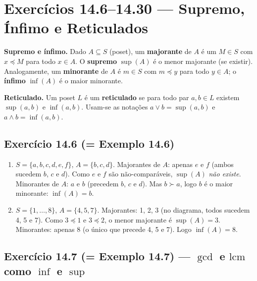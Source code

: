 \documentclass[12pt,a4paper]{article}
\newcommand{\keyword}[1]{\textbf{\textcolor{azul}{#1}}}
\begin{document}
\section*{Exercícios 14.6--14.30 — Supremo, Ínfimo e Reticulados}

\begin{teoriacaixa}
\textbf{Supremo e ínfimo.} Dado $A \subseteq S$ (poset), um \keyword{majorante} de $A$
é um $M \in S$ com $x \preceq M$ para todo $x \in A$. O \keyword{supremo} $\sup(A)$
é o menor majorante (se existir). Analogamente, um \keyword{minorante} de $A$ é $m \in S$
com $m \preceq y$ para todo $y \in A$; o \keyword{ínfimo} $\inf(A)$ é o maior minorante.

\textbf{Reticulado.} Um poset $L$ é um \keyword{reticulado} se para todo par $a,b \in L$
existem $\sup(a,b)$ e $\inf(a,b)$. Usam-se as notações $a \vee b = \sup(a,b)$ e
$a \wedge b = \inf(a,b)$.
\end{teoriacaixa}

\subsection*{Exercício 14.6 (= Exemplo 14.6)}

\begin{enumerate}[label=(\alph*)]
  \item $S = \{a,b,c,d,e,f\}$, $A = \{b,c,d\}$.
        Majorantes de $A$: apenas $e$ e $f$ (ambos sucedem $b$, $c$ e $d$).
        Como $e$ e $f$ são não-comparáveis, $\sup(A)$ \emph{não existe}.
        Minorantes de $A$: $a$ e $b$ (precedem $b$, $c$ e $d$). Mas $b \succ a$,
        logo $b$ é o maior minorante: $\inf(A) = b$.

  \item $S = \{1,\ldots,8\}$, $A = \{4,5,7\}$.
        Majorantes: 1, 2, 3 (no diagrama, todos sucedem 4, 5 e 7). Como $3 \preceq 1$
        e $3 \preceq 2$, o menor majorante é $\sup(A) = 3$.
        Minorantes: apenas $8$ (o único que precede 4, 5 e 7). Logo $\inf(A) = 8$.
\end{enumerate}

\subsection*{Exercício 14.7 (= Exemplo 14.7) — $\gcd$ e $\text{lcm}$ como $\inf$ e $\sup$}
\end{document}
